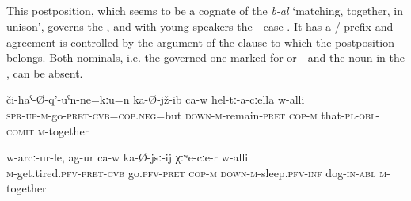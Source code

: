 
\subsection{ }
\label{ssec:postposition balli}

This postposition, which seems to be a cognate of the  \textit{b-al} `matching, together, in unison', governs the  , and with young speakers the - case . It has a / prefix and agreement is controlled by the  argument of the clause to which the postposition belongs. Both nominals, i.e. the governed one marked for  or - and the noun in the , can be absent.
%
\begin{exe}
	\ex
	\begin{xlist}
		\ex	\label{He is sitting together with them}
		\gll	či-haˁ-Ø-q'-uˁn-ne=kːu=n	ka-Ø-jž-ib	ca-w	hel-tː-a-cːella	w-alli  \\
			\textsc{spr-up}-\textsc{m}-go-\textsc{pret}-\textsc{cvb}=\textsc{cop.neg}=but	\textsc{down-m}-remain-\textsc{pret}	\textsc{cop-m}	that-\textsc{pl}-\textsc{obl}-\textsc{comit}	\textsc{m}-together\\
		\glt	{}

		\ex	\label{He went to sleep together with the dog}
		\gll	w-arcː-ur-le,	ag-ur	ca-w	ka-Ø-jsː-ij	χːʷe-cːe-r	w-alli  \\
			\textsc{m}-get.tired.\textsc{pfv}-\textsc{pret}-\textsc{cvb}	go.\textsc{pfv}-\textsc{pret}	\textsc{cop}-\textsc{m} \textsc{down-m}-sleep.\textsc{pfv}-\textsc{inf}	dog-\textsc{in}-\textsc{abl}	\textsc{m}-together\\
		\glt	{}
	\end{xlist}
\end{exe}

